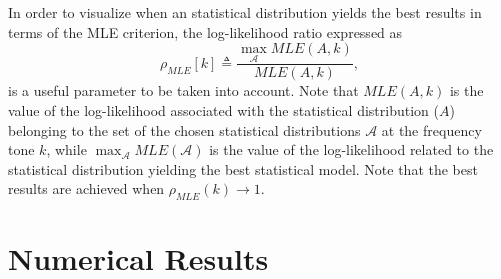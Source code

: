 \documentclass[journal]{IEEEtran}
\begin{document}
In order to visualize when an statistical distribution yields the best results in terms of the \ac{MLE} criterion, the log-likelihood ratio expressed as
\begin{equation}
\rho_{MLE} [k] \triangleq \dfrac{\max_{\mathcal{A}} MLE(A,k)}{MLE(A,k )},
\label{eq:log-lik0}
\end{equation}
is a useful parameter to be taken into account. Note that $ MLE(A,k)$ is the value of the log-likelihood associated with the statistical distribution ($A$) belonging to the set of the chosen statistical distributions $\mathcal{A}$ at the frequency tone $k$, while $\max_{\mathcal{A}} MLE(\mathcal{A})$ is the value of the log-likelihood related to the statistical distribution yielding the best statistical model. Note that the best results are achieved when $\rho_{MLE} (k) \rightarrow 1$.

\section{Numerical Results}

%
%	
\end{document}
